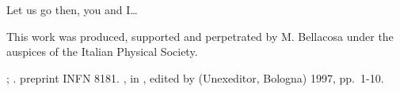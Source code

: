 \documentclass{subnucbo}
\begin{document}
\section{}
Let us go then, you and I\ldots

\acknowledgments
This work was produced, supported and perpetrated by M. Bellacosa under
the auspices of the Italian Physical Society.

\begin{thebibliography}{0}
 
  ;
  .
 
  preprint INFN 8181.
 
  ,
  in ,
                  edited by 
                  (Unexeditor, Bologna) 1997, pp.~1-10.
\end{thebibliography}
\end{document}
